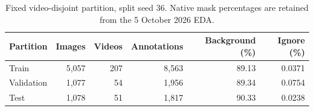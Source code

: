 \begin{table}[H]
\centering\small
\caption{Fixed video-disjoint partition, split seed 36. Native mask percentages are retained from the 5 October 2026 EDA.}\label{tab:split}
\begin{tabular}{lrrrrr}\toprule
Partition & Images & Videos & Annotations & Background (\%) & Ignore (\%) \\ \midrule
Train & 5,057 & 207 & 8,563 & 89.13 & 0.0371 \\
Validation & 1,077 & 54 & 1,956 & 89.34 & 0.0754 \\
Test & 1,078 & 51 & 1,817 & 90.33 & 0.0238 \\
\bottomrule\end{tabular}
\end{table}
